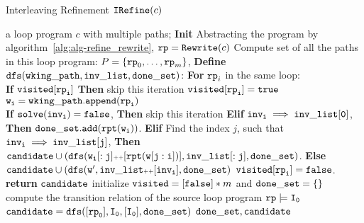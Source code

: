 

  \begin{algorithm}
    \caption{
    {Interleaving Refinement $\mathtt{IRefine}(c)$}
    }
    \label{alg:prog-refine}
    \begin{algorithmic}[1]
    \REQUIRE a loop program $c$ with multiple paths;
    \STATE  \textbf{Init} 
    \STATE Abstracting the program by algorithm~\ref{alg:alg-refine_rewrite},  $\mathtt{rp} = \mathtt{Rewrite}(c)$
    \STATE  Compute set of all the paths in this loop program:
    $P = \{\mathtt{rp}_0, \ldots, \mathtt{rp}_m\}$,
    \STATE \textbf{Define} {$\mathtt{dfs(wking\_path, inv\_list, done\_set)}$:}
    \STATE {}
    \STATE {}
    \STATE \quad \textbf{For} $\mathtt{rp}_i$ in the same loop:
    \\
    \STATE \quad \quad \textbf{If} {$\mathtt{visited[\mathtt{rp}_i]}$} \textbf{Then} skip this iteration
    \STATE \quad \quad $\mathtt{visited[\mathtt{rp}_i]} = \mathtt{true}$
    \STATE \quad \quad $\mathtt{w_i = wking\_path.append(\mathtt{rp}_i)}$
    \\
    \quad {}
    \STATE \quad \quad \textbf{If} {$\mathtt{solve(inv_i) = \mathtt{false}}$}, \textbf{Then} skip this iteration
    \STATE \quad \quad \textbf{Elif} {$\mathtt{inv_i \implies inv\_list[0]}$}, \textbf{Then}  $\mathtt{done\_set.add(\mathtt{rpt}(w_i))}$.
    \STATE \quad \quad \textbf{Elif} 
    Find the index $j$, such that $\mathtt{inv_i \implies inv\_list[j] }$, \textbf{Then}
    \STATE \quad \quad \quad
    $\mathtt{candidate \cup (dfs(w_i[:j] {\scriptscriptstyle ++} [\mathtt{rpt}(w[j:i])], inv\_list[:j], done\_set)}$.
    \STATE \quad \quad \textbf{Else}  
    $\mathtt{candidate \cup (dfs(w', inv\_list{\scriptscriptstyle ++}[inv_i], done\_set)}$
    \STATE \quad \quad $\mathtt{visited[\mathtt{rp}_i]} = \mathtt{false}$.
    \STATE \quad \textbf{return} $\mathtt{candidate}$
    \STATE initialize $\mathtt{visited} = [\mathtt{false}]*m$ and $\mathtt{done\_set = \{\}}$
    \STATE compute the transition relation of the source loop program $\mathtt{rp} \models \mathtt{I_0}$
    \STATE $\mathtt{candidate = dfs([\mathtt{rp}_0], I_0, [I_0], done\_set )}$
    \RETURN $\mathtt{done\_set, candidate}$
    \end{algorithmic}
    \end{algorithm}


